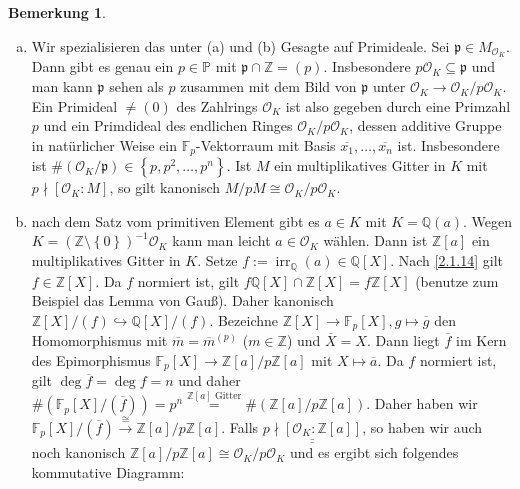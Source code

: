 \documentclass[
twoside=semi,
fontsize=12,
DIV=12, 
cleardoublepage=current,
leqno,
headings=optiontoheadandtoc, 
toc=idx
]{scrbook}
\newcommand{\Z}{\mathbb{Z}}
\newcommand{\Q}{\mathbb{Q}}
\newcommand{\F}{\mathbb{F}}
\renewcommand{\P}{\mathbb{P}}
\newcommand{\set}[1]{\left\{ #1 \right\}}
\DeclareMathOperator{\irr}{irr}
\theoremstyle{definition}
\newtheorem{bemerkung}[definition]{Bemerkung}
\begin{document}
\begin{bemerkung}
\begin{enumerate}[(a)]
			\item Wir spezialisieren das unter (a) und (b) Gesagte auf Primideale. Sei $\mathfrak{p} \in M_{\mathcal{O}_K}$. Dann gibt es genau ein $p \in \P$ mit $\mathfrak{p} \cap \Z = (p)$. Insbesondere
			$p\mathcal{O}_K \subseteq \mathfrak{p}$ und man kann $\mathfrak{p}$ sehen als $p$ zusammen mit dem Bild von $\mathfrak{p}$ unter $\mathcal{O}_K \to \mathcal{O}_K/p\mathcal{O}_K$.
			Ein Primideal $\neq (0)$ des Zahlrings $\mathcal{O}_K$ ist also gegeben durch eine Primzahl $p$ und ein Primdideal des endlichen Ringes $\mathcal{O}_K/p\mathcal{O}_K$, dessen additive Gruppe in nat\"urlicher Weise ein \linebreak $\F_p$-Vektorraum mit Basis $\overline{x_1}, \dots, \overline{x_n}$ ist. Insbesondere ist $\#(\mathcal{O}_K/\mathfrak{p}) \in \set{p, p^2, \dots, p^n}$. Ist $M$ ein multiplikatives Gitter in $K$ mit $p\nmid [\mathcal{O}_K:M]$, so gilt kanonisch \linebreak $M/pM \cong \mathcal{O}_K/p\mathcal{O}_K$.
			
			\item nach dem Satz vom primitiven Element gibt es $a \in K$ mit $K = \Q(a)$.  Wegen $K = (\Z\setminus\set{0})^{-1}\mathcal{O}_K$ kann man leicht $a \in \mathcal{O}_K$ w\"ahlen. Dann ist $\Z[a]$ ein multiplikatives Gitter in $K$. Setze $f:= \irr_\Q(a) \in \Q[X]$. Nach \ref{2.1.14} gilt $f \in \Z[X]$. Da $f$ normiert ist, gilt $f\Q[X] \cap \Z[X] = f\Z[X]$ (benutze zum Beispiel das Lemma von Gau\ss). Daher kanonisch $\Z[X]/(f) \hookrightarrow \Q[X]/(f)$. Bezeichne $\Z[X] \to \F_p[X], g \mapsto \overline{g}$ den Homomorphismus mit $\overline{m} = \overline{m}^{(p)}$ ($m \in \Z$) und $\overline{X} = X$. Dann liegt $\overline{f}$ im Kern des Epimorphismus $\F_p[X]\to \Z[a]/p\Z[a]$ mit $X\mapsto \overline{a}$. Da $f$ normiert ist, gilt \linebreak $\deg \overline{f} = \deg f = n$ und daher $\#(\F_p[X]/(\overline{f})) = p^n \overset{\Z[a] \textrm{ Gitter}}{=} \#(\Z[a]/p\Z[a])$. Daher haben wir $\F_p[X]/(\overline{f}) \overset{\cong}{\to} \Z[a]/p\Z[a]$. Falls $\underline{\underline{p \nmid [\mathcal{O}_K:\Z[a]]}}$, so haben wir auch noch kanonisch $\Z[a]/p\Z[a] \cong \mathcal{O}_K/p\mathcal{O}_K$ und es ergibt sich folgendes kommutative Diagramm:
			

\end{enumerate}
\end{bemerkung}
\end{document}
